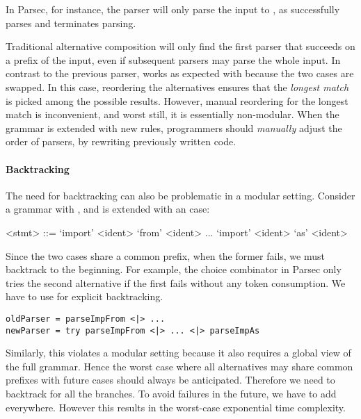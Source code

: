In Parsec, for instance, the parser  will only parse the input  to , as  successfully parses 
and terminates parsing.

Traditional alternative composition will only find the first parser that succeeds on a prefix of the input,
even if subsequent parsers may parse the whole input. In contrast to the previous parser,  works as expected with because the two cases are swapped.
In this case, reordering the alternatives ensures that
the \emph{longest match} is picked among the possible results. However, manual reordering for the longest match is inconvenient, and worst still, it is essentially non-modular. When the grammar is extended with new rules, programmers should \emph{manually} adjust
the order of parsers, by rewriting previously written code.

\paragraph{Backtracking} The need for backtracking can also be problematic
in a modular setting. Consider a grammar with , 
and is extended with an  case:

\vspace{-2pt}
\setlength{\grammarindent}{5em}
\begin{grammar}
<stmt> ::= `import' <ident> `from' <ident>
    \alt ...
    \alt `import' <ident> `as' <ident>
\end{grammar}
\vspace{-2pt}
Since the two cases share a common prefix, when the former fails, we must backtrack to the beginning.
For example, the choice combinator in Parsec only tries the second alternative if the first fails
without any token consumption. We have to use  for explicit backtracking.

\vspace{-4pt}
\begin{lstlisting}[language=PlainCode]
oldParser = parseImpFrom <|> ...
newParser = try parseImpFrom <|> ... <|> parseImpAs
\end{lstlisting}
\vspace{-4pt}

Similarly, this violates a modular setting because it also requires a global view of the full grammar.
Hence the worst case where all alternatives may share common prefixes with future cases
should always be anticipated. Therefore we need to backtrack for all the branches. To avoid failures in the future, we have to add  everywhere. However this results in the worst-case exponential time
complexity.

